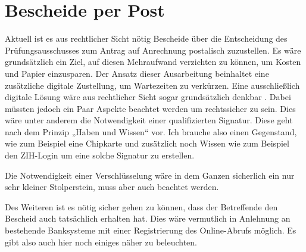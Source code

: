 \section{Bescheide per Post}

Aktuell ist es aus rechtlicher Sicht nötig Bescheide über die Entscheidung des Prüfungsausschusses zum Antrag auf Anrechnung postalisch zuzustellen. Es wäre grundsätzlich ein Ziel, auf diesen Mehraufwand verzichten zu können, um Kosten und Papier einzusparen. Der Ansatz dieser Ausarbeitung beinhaltet eine zusätzliche digitale Zustellung, um Wartezeiten zu verkürzen.
Eine ausschließlich digitale Lösung wäre aus rechtlicher Sicht sogar grundsätzlich denkbar \parencite{protokoll}. Dabei müssten jedoch ein Paar Aspekte beachtet werden um rechtssicher zu sein. Dies wäre unter anderem die Notwendigkeit einer qualifizierten Signatur. Diese geht nach dem Prinzip „Haben und Wissen“ vor. Ich brauche also einen Gegenstand, wie zum Beispiel eine Chipkarte und zusätzlich noch Wissen wie zum Beispiel den ZIH-Login um eine solche Signatur zu erstellen.

Die Notwendigkeit einer Verschlüsselung wäre in dem Ganzen sicherlich ein nur sehr kleiner Stolperstein, muss aber auch beachtet werden.

Des Weiteren ist es nötig sicher gehen zu können, dass der Betreffende den Bescheid auch tatsächlich erhalten hat. Dies wäre vermutlich in Anlehnung an bestehende Banksysteme mit einer Registrierung des Online-Abrufs möglich. Es gibt also auch hier noch einiges näher zu beleuchten.
